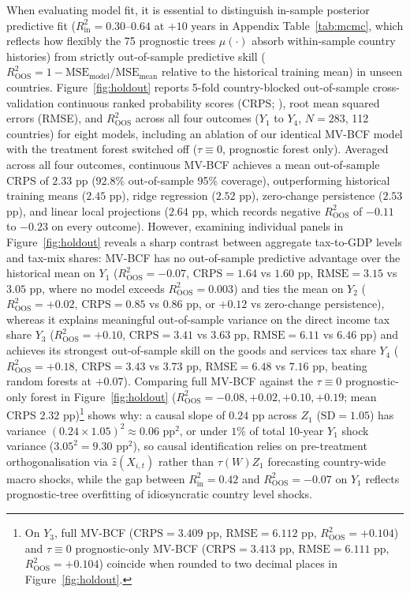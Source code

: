 \documentclass[11pt,a4paper]{article}
\begin{document}
When evaluating model fit, it is essential to distinguish in-sample posterior predictive fit ($R^2_{\text{in}} = 0.30\text{--}0.64$ at $+10$ years in Appendix Table~\ref{tab:mcmc}, which reflects how flexibly the 75 prognostic trees $\mu(\cdot)$ absorb within-sample country histories) from strictly out-of-sample predictive skill ($R^2_{\text{OOS}} = 1 - \text{MSE}_{\text{model}} / \text{MSE}_{\text{mean}}$ relative to the historical training mean) in unseen countries. Figure~\ref{fig:holdout} reports 5-fold country-blocked out-of-sample cross-validation continuous ranked probability scores (CRPS; \citealt{diebold1995comparing, gneiting2007strictly}), root mean squared errors (RMSE), and $R^2_{\text{OOS}}$ across all four outcomes ($Y_1$ to $Y_4$, $N = 283$, 112 countries) for eight models, including an ablation of our identical MV-BCF model with the treatment forest switched off ($\tau \equiv 0$, prognostic forest only). Averaged across all four outcomes, continuous MV-BCF achieves a mean out-of-sample CRPS of $2.33$ pp ($92.8\%$ out-of-sample 95\% coverage), outperforming historical training means ($2.45$ pp), ridge regression ($2.52$ pp), zero-change persistence ($2.53$ pp), and linear local projections ($2.64$ pp, which records negative $R^2_{\text{OOS}}$ of $-0.11$ to $-0.23$ on every outcome). However, examining individual panels in Figure~\ref{fig:holdout} reveals a sharp contrast between aggregate tax-to-GDP levels and tax-mix shares: MV-BCF has no out-of-sample predictive advantage over the historical mean on $Y_1$ ($R^2_{\text{OOS}} = -0.07$, $\text{CRPS} = 1.64$ vs $1.60$ pp, $\text{RMSE} = 3.15$ vs $3.05$ pp, where no model exceeds $R^2_{\text{OOS}} = 0.003$) and ties the mean on $Y_2$ ($R^2_{\text{OOS}} = +0.02$, $\text{CRPS} = 0.85$ vs $0.86$ pp, or $+0.12$ vs zero-change persistence), whereas it explains meaningful out-of-sample variance on the direct income tax share $Y_3$ ($R^2_{\text{OOS}} = +0.10$, $\text{CRPS} = 3.41$ vs $3.63$ pp, $\text{RMSE} = 6.11$ vs $6.46$ pp) and achieves its strongest out-of-sample skill on the goods and services tax share $Y_4$ ($R^2_{\text{OOS}} = +0.18$, $\text{CRPS} = 3.43$ vs $3.73$ pp, $\text{RMSE} = 6.48$ vs $7.16$ pp, beating random forests at $+0.07$). Comparing full MV-BCF against the $\tau \equiv 0$ prognostic-only forest in Figure~\ref{fig:holdout} ($R^2_{\text{OOS}} = -0.08, +0.02, +0.10, +0.19$; mean CRPS $2.32$ pp)\footnote{\raggedright On $Y_3$, full MV-BCF ($\text{CRPS} = 3.409$ pp, $\text{RMSE} = 6.112$ pp, $R^2_{\text{OOS}} = +0.104$) and $\tau \equiv 0$ prognostic-only MV-BCF ($\text{CRPS} = 3.413$ pp, $\text{RMSE} = 6.111$ pp, $R^2_{\text{OOS}} = +0.104$) coincide when rounded to two decimal places in Figure~\ref{fig:holdout}.} shows why: a causal slope of $0.24$ pp across $Z_1$ ($\text{SD} = 1.05$) has variance $(0.24 \times 1.05)^2 \approx 0.06\text{ pp}^2$, or under $1\%$ of total 10-year $Y_1$ shock variance ($3.05^2 = 9.30\text{ pp}^2$), so causal identification relies on pre-treatment orthogonalisation via $\hat{z}(X_{i,t})$ rather than $\tau(W)Z_1$ forecasting country-wide macro shocks, while the gap between $R^2_{\text{in}} = 0.42$ and $R^2_{\text{OOS}} = -0.07$ on $Y_1$ reflects prognostic-tree overfitting of idiosyncratic country level shocks.
\end{document}
